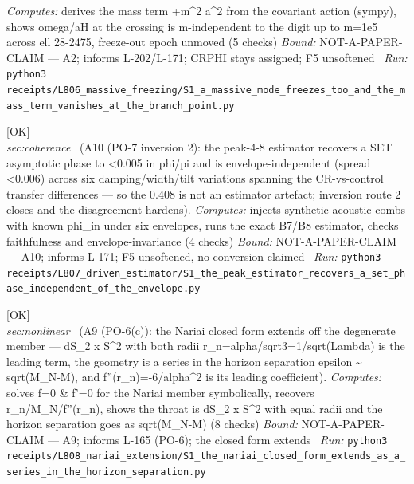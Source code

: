 \begin{description}
\emph{Computes:} derives the mass term +m\textasciicircum{}2 a\textasciicircum{}2 from the covariant action (sympy), shows omega/\textbar{}aH\textbar{} at the crossing is m-independent to the digit up to m=1e5 across ell 28-2475, freeze-out epoch unmoved (5 checks)
 \emph{Bound:} NOT-A-PAPER-CLAIM --- A2; informs L-202/L-171; CRPHI stays assigned; F5 unsoftened
\ \emph{Run:} \texttt{python3 receipts/L806\_massive\_freezing/S1\_a\_massive\_mode\_freezes\_too\_and\_the\_mass\_term\_vanishes\_at\_the\_branch\_point.py}
\item[\label{rcpt:S1_the_peak_estimator_recovers_a_set_phase_independent_of_the_envelope}\texttt{S1\_the\_peak\_estimator\_recovers\_a\_set\_phase\_independent\_of\_the\_envelope}]\hfill\textsf{[OK]}\\
\textit{sec:coherence} \ (A10 (PO-7 inversion 2): the peak-4-8 estimator recovers a SET asymptotic phase to <0.005 in phi/pi and is envelope-independent (spread <0.006) across six damping/width/tilt variations spanning the CR-vs-control transfer differences --- so the 0.408 is not an estimator artefact; inversion route 2 closes and the disagreement hardens). 
\emph{Computes:} injects synthetic acoustic combs with known phi\_in under six envelopes, runs the exact B7/B8 estimator, checks faithfulness and envelope-invariance (4 checks)
 \emph{Bound:} NOT-A-PAPER-CLAIM --- A10; informs L-171; F5 unsoftened, no conversion claimed
\ \emph{Run:} \texttt{python3 receipts/L807\_driven\_estimator/S1\_the\_peak\_estimator\_recovers\_a\_set\_phase\_independent\_of\_the\_envelope.py}
\item[\label{rcpt:S1_the_nariai_closed_form_extends_as_a_series_in_the_horizon_separation}\texttt{S1\_the\_nariai\_closed\_form\_extends\_as\_a\_series\_in\_the\_horizon\_separation}]\hfill\textsf{[OK]}\\
\textit{sec:nonlinear} \ (A9 (PO-6(c)): the Nariai closed form extends off the degenerate member --- dS\_2 x S\textasciicircum{}2 with both radii r\_n=alpha/sqrt3=1/sqrt(Lambda) is the leading term, the geometry is a series in the horizon separation epsilon \textasciitilde{} sqrt(M\_N-M), and f''(r\_n)=-6/alpha\textasciicircum{}2 is its leading coefficient). 
\emph{Computes:} solves f=0 \& f'=0 for the Nariai member symbolically, recovers r\_n/M\_N/f''(r\_n), shows the throat is dS\_2 x S\textasciicircum{}2 with equal radii and the horizon separation goes as sqrt(M\_N-M) (8 checks)
 \emph{Bound:} NOT-A-PAPER-CLAIM --- A9; informs L-165 (PO-6); the closed form extends
\ \emph{Run:} \texttt{python3 receipts/L808\_nariai\_extension/S1\_the\_nariai\_closed\_form\_extends\_as\_a\_series\_in\_the\_horizon\_separation.py}

\end{description}
